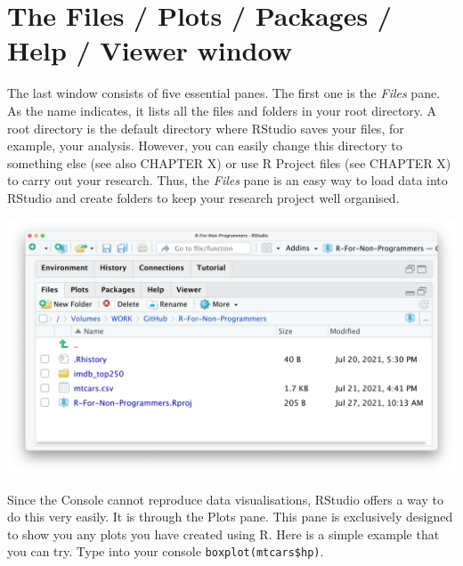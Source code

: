 \documentclass[
]{book}
\newenvironment{Shaded}{\begin{snugshade}}{\end{snugshade}}
\newcommand{\CommentTok}[1]{\textcolor[rgb]{0.56,0.35,0.01}{\textit{#1}}}
\newcommand{\FunctionTok}[1]{\textcolor[rgb]{0.00,0.00,0.00}{#1}}
\newcommand{\NormalTok}[1]{#1}
\newcommand{\SpecialCharTok}[1]{\textcolor[rgb]{0.00,0.00,0.00}{#1}}
\begin{document}
\hypertarget{the-files-plots-packages-help-viewer-window}{%
\section{The Files / Plots / Packages / Help / Viewer window}\label{the-files-plots-packages-help-viewer-window}}

The last window consists of five essential panes. The first one is the \emph{Files} pane. As the name indicates, it lists all the files and folders in your root directory. A root directory is the default directory where RStudio saves your files, for example, your analysis. However, you can easily change this directory to something else (see also CHAPTER X) or use R Project files (see CHAPTER X) to carry out your research. Thus, the \emph{Files} pane is an easy way to load data into RStudio and create folders to keep your research project well organised.

\includegraphics{images/chapter_04_img/05_files_plots_etc/01_rstudio_files.png}

Since the Console cannot reproduce data visualisations, RStudio offers a way to do this very easily. It is through the Plots pane. This pane is exclusively designed to show you any plots you have created using R. Here is a simple example that you can try. Type into your console \texttt{boxplot(mtcars\$hp)}.

\begin{Shaded}
\end{Shaded}
\end{document}
